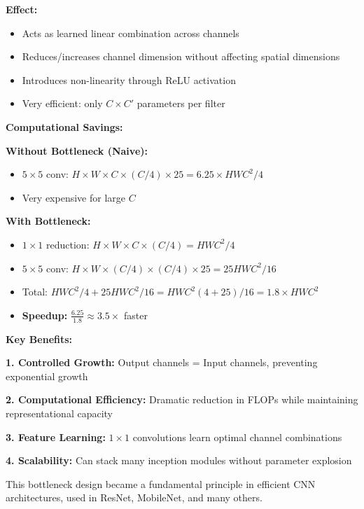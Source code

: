 \documentclass[12pt]{article}
\begin{document}
\begin{enumerate}[(a)]
{    \textbf{Effect:}
    \begin{itemize}
        \item Acts as learned linear combination across channels
        \item Reduces/increases channel dimension without affecting spatial dimensions
        \item Introduces non-linearity through ReLU activation
        \item Very efficient: only $C \times C'$ parameters per filter
    \end{itemize}
    
    \textbf{Computational Savings:}
    
    \textbf{Without Bottleneck (Naive):}
    \begin{itemize}
        \item $5 \times 5$ conv: $H \times W \times C \times (C/4) \times 25 = 6.25 \times HWC^2/4$
        \item Very expensive for large $C$
    \end{itemize}
    
    \textbf{With Bottleneck:}
    \begin{itemize}
        \item $1 \times 1$ reduction: $H \times W \times C \times (C/4) = HWC^2/4$
        \item $5 \times 5$ conv: $H \times W \times (C/4) \times (C/4) \times 25 = 25HWC^2/16$  
        \item Total: $HWC^2/4 + 25HWC^2/16 = HWC^2(4+25)/16 = 1.8 \times HWC^2$
        \item \textbf{Speedup:} $\frac{6.25}{1.8} \approx 3.5\times$ faster
    \end{itemize}
    
    \textbf{Key Benefits:}
    
    \textbf{1. Controlled Growth:}
    Output channels = Input channels, preventing exponential growth
    
    \textbf{2. Computational Efficiency:}
    Dramatic reduction in FLOPs while maintaining representational capacity
    
    \textbf{3. Feature Learning:}
    $1 \times 1$ convolutions learn optimal channel combinations
    
    \textbf{4. Scalability:}
    Can stack many inception modules without parameter explosion
    
    This bottleneck design became a fundamental principle in efficient CNN architectures, used in ResNet, MobileNet, and many others.
    }
    

\end{enumerate}
\end{document}
